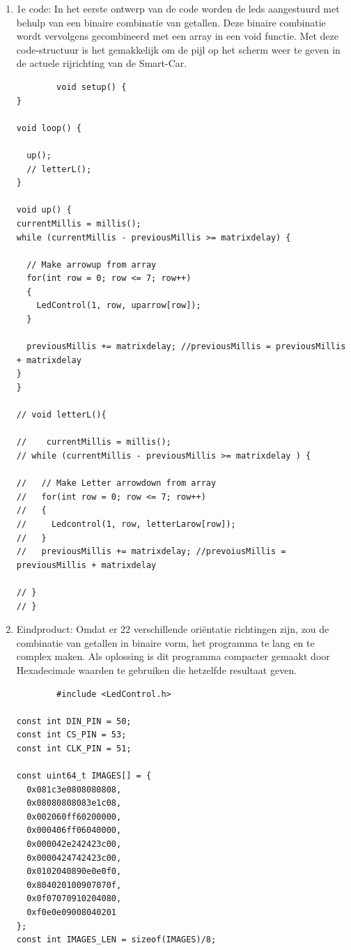 \begin{enumerate}
\begin{lstlisting}
  // Make Letter "R" from array
  for(int row = 0; row <= 7; row++)
  {
    Matrix.setRow(1, row, R[row]);
    delay(100);
  }
  delay(1000);

  // invert display
  Matrix.invertDisplay(1);
  delay(1000);
  
  // clear display
  Matrix.clearDisplay(1);
  delay(1000);
}
    \end{lstlisting}
    \item 1e code: In het eerste ontwerp van de code worden de leds aangestuurd met behulp van een binaire combinatie van getallen. Deze binaire combinatie wordt vervolgens gecombineerd met een array in een void functie. Met deze code-structuur is het gemakkelijk om de pijl op het scherm weer te geven in de actuele rijrichting van de \gls{Smart-Car}. 
    \begin{lstlisting}
        void setup() {  
}

void loop() {
 
  up();
  // letterL();    
}

void up() {
currentMillis = millis();  
while (currentMillis - previousMillis >= matrixdelay) {

  // Make arrowup from array
  for(int row = 0; row <= 7; row++)
  {
    LedControl(1, row, uparrow[row]);
  }
  
  previousMillis += matrixdelay; //previousMillis = previousMillis + matrixdelay
}
}

// void letterL(){
  
//    currentMillis = millis(); 
// while (currentMillis - previousMillis >= matrixdelay ) {
 
//   // Make Letter arrowdown from array
//   for(int row = 0; row <= 7; row++)
//   {
//     Ledcontrol(1, row, letterLarow[row]);
//   }
//   previousMillis += matrixdelay; //prevoiusMillis = previousMillis + matrixdelay
  
// }
// }
    \end{lstlisting}
    \item Eindproduct: Omdat er 22 verschillende oriëntatie richtingen zijn, zou de combinatie van getallen in binaire vorm, het programma te lang en te complex maken. Als oplossing  is dit programma compacter gemaakt door Hexadecimale waarden te gebruiken die hetzelfde resultaat geven.
    \begin{lstlisting}
        #include <LedControl.h>

const int DIN_PIN = 50;
const int CS_PIN = 53;
const int CLK_PIN = 51;

const uint64_t IMAGES[] = {
  0x081c3e0808080808,
  0x08080808083e1c08,
  0x002060ff60200000,
  0x000406ff06040000,
  0x000042e242423c00,
  0x0000424742423c00,
  0x0102040890e0e0f0,
  0x804020100907070f,
  0x0f07070910204080,
  0xf0e0e09008040201
};
const int IMAGES_LEN = sizeof(IMAGES)/8;


\end{lstlisting}
\end{enumerate}
